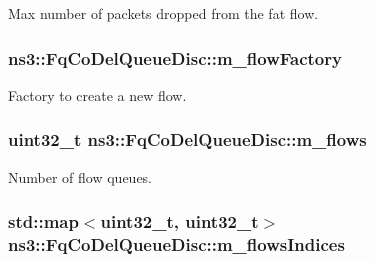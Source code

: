 Max number of packets dropped from the fat flow. 

\subsubsection[{\texorpdfstring{m\+\_\+flow\+Factory}{m_flowFactory}}]{ ns3\+::\+Fq\+Co\+Del\+Queue\+Disc\+::m\+\_\+flow\+Factory\hspace{0.3cm}{\ttfamily [private]}}\hypertarget{classns3_1_1FqCoDelQueueDisc_a36344316002e616efd119c6a6985bfaa}{}\label{classns3_1_1FqCoDelQueueDisc_a36344316002e616efd119c6a6985bfaa}


Factory to create a new flow. 

\subsubsection[{\texorpdfstring{m\+\_\+flows}{m_flows}}]{\setlength{\rightskip}{0pt plus 5cm}uint32\+\_\+t ns3\+::\+Fq\+Co\+Del\+Queue\+Disc\+::m\+\_\+flows\hspace{0.3cm}{\ttfamily [private]}}\hypertarget{classns3_1_1FqCoDelQueueDisc_afdd4c8c212430bea70aefde0df14df43}{}\label{classns3_1_1FqCoDelQueueDisc_afdd4c8c212430bea70aefde0df14df43}


Number of flow queues. 

\subsubsection[{\texorpdfstring{m\+\_\+flows\+Indices}{m_flowsIndices}}]{\setlength{\rightskip}{0pt plus 5cm}std\+::map$<$uint32\+\_\+t, uint32\+\_\+t$>$ ns3\+::\+Fq\+Co\+Del\+Queue\+Disc\+::m\+\_\+flows\+Indices\hspace{0.3cm}{\ttfamily [private]}}\hypertarget{classns3_1_1FqCoDelQueueDisc_a7ddb7f3d7e4f79c6e1c0cf3803423054}{}\label{classns3_1_1FqCoDelQueueDisc_a7ddb7f3d7e4f79c6e1c0cf3803423054}


